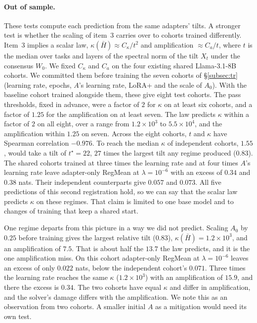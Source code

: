 \paragraph{Out of sample.} These tests compute each prediction from the same
adapters' tilts. A stronger test is whether the scaling of item~3 carries over
to cohorts trained differently. Item~3 implies a scalar law,
$\kappa(\bar H) \approx C_\kappa / t^2$ and amplification $\approx C_a / t$,
where $t$ is the median over tasks and layers of the spectral norm of the tilt
$X_t$ under the consensus $W_0$. We fixed $C_\kappa$ and $C_a$ on the four
existing shared Llama-3.1-8B cohorts. We committed them before training the
seven cohorts of \S\ref{subsec:tr} (learning rate, epochs, $A$'s learning
rate, LoRA+ and the scale of $A_0$). With the baseline cohort trained
alongside them, these give eight test cohorts. The pass thresholds, fixed in advance, were
a factor of $2$ for $\kappa$ on at least six cohorts, and a factor of $1.25$
for the amplification on at least seven. The law predicts $\kappa$ within a
factor of $2$ on all eight, over a range from $1.2\times10^{3}$ to
$5.5\times10^{4}$, and the amplification within $1.25$ on seven. Across the
eight cohorts, $t$ and $\kappa$ have Spearman correlation $-0.976$. To reach
the median $\kappa$ of independent cohorts, $1.55$, would take a tilt of
$t^\star = 22$, $27$ times the largest tilt any regime produced ($0.83$). The
shared cohorts trained at three times the learning rate and at four times
$A$'s learning rate leave adapter-only RegMean at $\lambda = 10^{-6}$ with an
excess of $0.34$ and $0.38$ nats. Their independent counterparts give $0.057$
and $0.073$. All five predictions of this second registration hold, so we can
say that the scalar law predicts $\kappa$ on these regimes. That claim is
limited to one base model and to changes of training that keep a shared
start.

One regime departs from this picture in a way we did not predict. Scaling
$A_0$ by $0.25$ before training gives the largest relative tilt ($0.83$),
$\kappa(\bar H) = 1.2\times10^{3}$, and an amplification of $7.5$. That is
about half the $13.7$ the law predicts, and it is the one amplification miss.
On this cohort adapter-only RegMean at $\lambda = 10^{-6}$ leaves an excess of
only $0.022$ nats, below the independent cohort's $0.071$. Three times the
learning rate reaches the same $\kappa$ ($1.2\times10^{3}$) with an
amplification of $15.9$, and there the excess is $0.34$. The two cohorts have
equal $\kappa$ and differ in amplification, and the solver's damage differs
with the amplification. We note this as an observation from two cohorts. A
smaller initial $A$ as a mitigation would need its own test.

